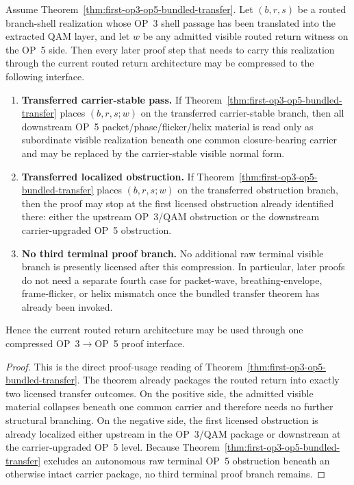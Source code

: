 \begin{proposition}
\label{prop:first-op3-op5-compressed-proof-interface}
Assume Theorem~\ref{thm:first-op3-op5-bundled-transfer}. Let $(b,r,s)$ be a routed branch-shell realization whose OP~3 shell passage has been translated into the extracted QAM layer, and let $w$ be any admitted visible routed return witness on the OP~5 side. Then every later proof step that needs to carry this realization through the current routed return architecture may be compressed to the following interface.
\begin{enumerate}[leftmargin=2em,label=(\roman*)]
\item \textbf{Transferred carrier-stable pass.} If Theorem~\ref{thm:first-op3-op5-bundled-transfer} places $(b,r,s;w)$ on the transferred carrier-stable branch, then all downstream OP~5 packet/phase/flicker/helix material is read only as subordinate visible realization beneath one common closure-bearing carrier and may be replaced by the carrier-stable visible normal form.
\item \textbf{Transferred localized obstruction.} If Theorem~\ref{thm:first-op3-op5-bundled-transfer} places $(b,r,s;w)$ on the transferred obstruction branch, then the proof may stop at the first licensed obstruction already identified there: either the upstream OP~3/QAM obstruction or the downstream carrier-upgraded OP~5 obstruction.
\item \textbf{No third terminal proof branch.} No additional raw terminal visible branch is presently licensed after this compression. In particular, later proofs do not need a separate fourth case for packet-wave, breathing-envelope, frame-flicker, or helix mismatch once the bundled transfer theorem has already been invoked.
\end{enumerate}
Hence the current routed return architecture may be used through one compressed OP~3$\to$OP~5 proof interface.
\end{proposition}

\begin{proof}
This is the direct proof-usage reading of Theorem~\ref{thm:first-op3-op5-bundled-transfer}. The theorem already packages the routed return into exactly two licensed transfer outcomes. On the positive side, the admitted visible material collapses beneath one common carrier and therefore needs no further structural branching. On the negative side, the first licensed obstruction is already localized either upstream in the OP~3/QAM package or downstream at the carrier-upgraded OP~5 level. Because Theorem~\ref{thm:first-op3-op5-bundled-transfer} excludes an autonomous raw terminal OP~5 obstruction beneath an otherwise intact carrier package, no third terminal proof branch remains.
\end{proof}

